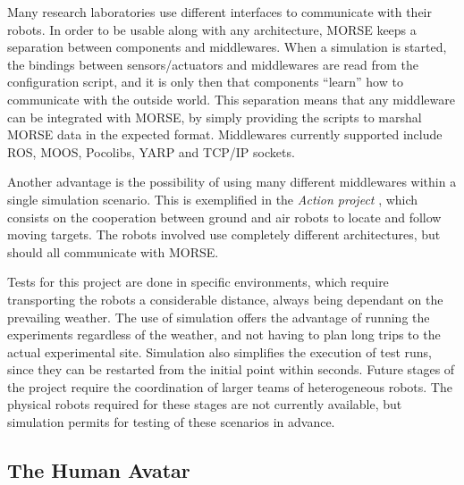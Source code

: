 \documentclass{llncs}
\begin{document}
Many research laboratories use different interfaces to communicate with their
robots. In order to be usable along with any architecture, MORSE keeps a
separation between components and middlewares.  When a simulation is started,
the bindings between sensors/actuators and middlewares are read from the
configuration script, and it is only then that components ``learn'' how to
communicate with the outside world.
This separation means that any middleware can be integrated with MORSE, by
simply providing the scripts to marshal MORSE data in the expected format.
Middlewares currently supported include ROS, MOOS, Pocolibs, YARP and
TCP/IP sockets.

Another advantage is the possibility of using many different middlewares within
a single simulation scenario. This is exemplified in the \emph{Action project}
\cite{6106782}, which consists on the cooperation between ground
and air robots to locate and follow moving targets.
The robots involved use completely different architectures, but should all
communicate with MORSE.

Tests for this project are done in specific environments, which require
transporting the robots a considerable distance, always being dependant on the
prevailing weather.  The use of
simulation offers the advantage of running the experiments regardless of the
weather, and not having to plan long trips to the actual experimental site.
Simulation also simplifies the execution of test runs, since they can be
restarted from the initial point within seconds.  Future stages of the project
require the coordination of larger teams of heterogeneous robots. The physical
robots required for these stages are not currently available, but simulation
permits for testing of these scenarios in advance.



\subsection{The Human Avatar}
\label{section:human}
\end{document}
